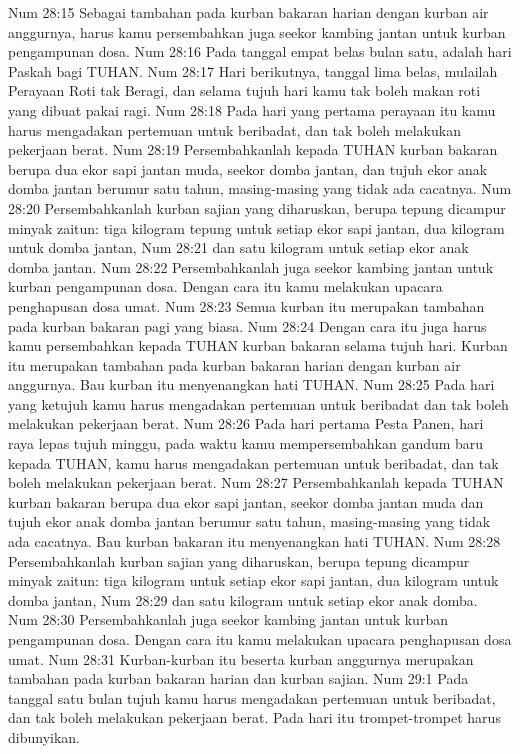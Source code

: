 Num 28:15  Sebagai tambahan pada kurban bakaran harian dengan kurban air anggurnya, harus kamu persembahkan juga seekor kambing jantan untuk kurban pengampunan dosa.
Num 28:16  Pada tanggal empat belas bulan satu, adalah hari Paskah bagi TUHAN.
Num 28:17  Hari berikutnya, tanggal lima belas, mulailah Perayaan Roti tak Beragi, dan selama tujuh hari kamu tak boleh makan roti yang dibuat pakai ragi.
Num 28:18  Pada hari yang pertama perayaan itu kamu harus mengadakan pertemuan untuk beribadat, dan tak boleh melakukan pekerjaan berat.
Num 28:19  Persembahkanlah kepada TUHAN kurban bakaran berupa dua ekor sapi jantan muda, seekor domba jantan, dan tujuh ekor anak domba jantan berumur satu tahun, masing-masing yang tidak ada cacatnya.
Num 28:20  Persembahkanlah kurban sajian yang diharuskan, berupa tepung dicampur minyak zaitun: tiga kilogram tepung untuk setiap ekor sapi jantan, dua kilogram untuk domba jantan,
Num 28:21  dan satu kilogram untuk setiap ekor anak domba jantan.
Num 28:22  Persembahkanlah juga seekor kambing jantan untuk kurban pengampunan dosa. Dengan cara itu kamu melakukan upacara penghapusan dosa umat.
Num 28:23  Semua kurban itu merupakan tambahan pada kurban bakaran pagi yang biasa.
Num 28:24  Dengan cara itu juga harus kamu persembahkan kepada TUHAN kurban bakaran selama tujuh hari. Kurban itu merupakan tambahan pada kurban bakaran harian dengan kurban air anggurnya. Bau kurban itu menyenangkan hati TUHAN.
Num 28:25  Pada hari yang ketujuh kamu harus mengadakan pertemuan untuk beribadat dan tak boleh melakukan pekerjaan berat.
Num 28:26  Pada hari pertama Pesta Panen, hari raya lepas tujuh minggu, pada waktu kamu mempersembahkan gandum baru kepada TUHAN, kamu harus mengadakan pertemuan untuk beribadat, dan tak boleh melakukan pekerjaan berat.
Num 28:27  Persembahkanlah kepada TUHAN kurban bakaran berupa dua ekor sapi jantan, seekor domba jantan muda dan tujuh ekor anak domba jantan berumur satu tahun, masing-masing yang tidak ada cacatnya. Bau kurban bakaran itu menyenangkan hati TUHAN.
Num 28:28  Persembahkanlah kurban sajian yang diharuskan, berupa tepung dicampur minyak zaitun: tiga kilogram untuk setiap ekor sapi jantan, dua kilogram untuk domba jantan,
Num 28:29  dan satu kilogram untuk setiap ekor anak domba.
Num 28:30  Persembahkanlah juga seekor kambing jantan untuk kurban pengampunan dosa. Dengan cara itu kamu melakukan upacara penghapusan dosa umat.
Num 28:31  Kurban-kurban itu beserta kurban anggurnya merupakan tambahan pada kurban bakaran harian dan kurban sajian.
Num 29:1  Pada tanggal satu bulan tujuh kamu harus mengadakan pertemuan untuk beribadat, dan tak boleh melakukan pekerjaan berat. Pada hari itu trompet-trompet harus dibunyikan.

